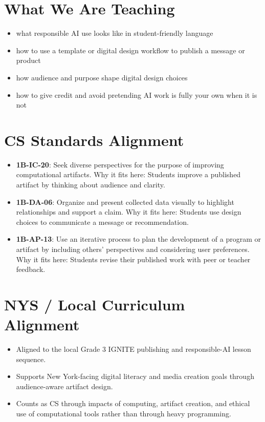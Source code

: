 \documentclass[11pt]{article}
\begin{document}
\section*{What We Are Teaching}
\begin{itemize}[leftmargin=*]
\item what responsible AI use looks like in student-friendly language
\item how to use a template or digital design workflow to publish a message or product
\item how audience and purpose shape digital design choices
\item how to give credit and avoid pretending AI work is fully your own when it is not
\end{itemize}

\section*{CS Standards Alignment}
\begin{itemize}[leftmargin=*]
\item \textbf{1B-IC-20}: Seek diverse perspectives for the purpose of improving computational artifacts. Why it fits here: Students improve a published artifact by thinking about audience and clarity.
\item \textbf{1B-DA-06}: Organize and present collected data visually to highlight relationships and support a claim. Why it fits here: Students use design choices to communicate a message or recommendation.
\item \textbf{1B-AP-13}: Use an iterative process to plan the development of a program or artifact by including others’ perspectives and considering user preferences. Why it fits here: Students revise their published work with peer or teacher feedback.
\end{itemize}

\section*{NYS / Local Curriculum Alignment}
\begin{itemize}[leftmargin=*]
\item Aligned to the local Grade 3 IGNITE publishing and responsible-AI lesson sequence.
\item Supports New York-facing digital literacy and media creation goals through audience-aware artifact design.
\item Counts as CS through impacts of computing, artifact creation, and ethical use of computational tools rather than through heavy programming.
\end{itemize}
\end{document}
